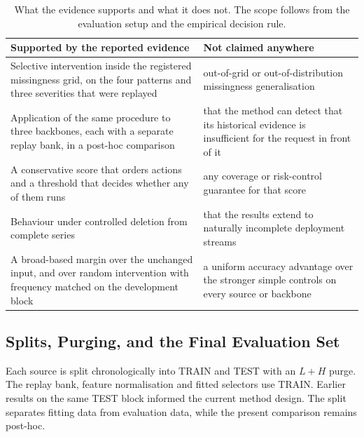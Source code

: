 \documentclass{article}
\begin{document}
\begin{table}[!t]
  \caption{What the evidence supports and what it does not. The scope follows from the evaluation setup and the empirical decision rule.}
  \label{tab:app-claims}
  \centering
  \small
  \setlength{\tabcolsep}{4pt}
\begin{tabular}{@{}p{} p{}@{}}
    \toprule
    Supported by the reported evidence & Not claimed anywhere \\
    \midrule
    Selective intervention inside the registered missingness grid, on the four patterns and three severities that were replayed & out-of-grid or out-of-distribution missingness generalisation \\
    Application of the same procedure to three backbones, each with a separate replay bank, in a post-hoc comparison & that the method can detect that its historical evidence is insufficient for the request in front of it \\
    A conservative score that orders actions and a threshold that decides whether any of them runs & any coverage or risk-control guarantee for that score \\
    Behaviour under controlled deletion from complete series & that the results extend to naturally incomplete deployment streams \\
    A broad-based margin over the unchanged input, and over random intervention with frequency matched on the development block & a uniform accuracy advantage over the stronger simple controls on every source or backbone \\
    \bottomrule
  \end{tabular}
\end{table}

\subsection{Splits, Purging, and the Final Evaluation Set}
\label{app:splits}
Each source is split chronologically into TRAIN and TEST with an $L+H$ purge.
The replay bank, feature normalisation and fitted selectors use TRAIN. Earlier results on
the same TEST block informed the current method design. The split separates fitting data
from evaluation data, while the present comparison remains post-hoc.
\end{document}
